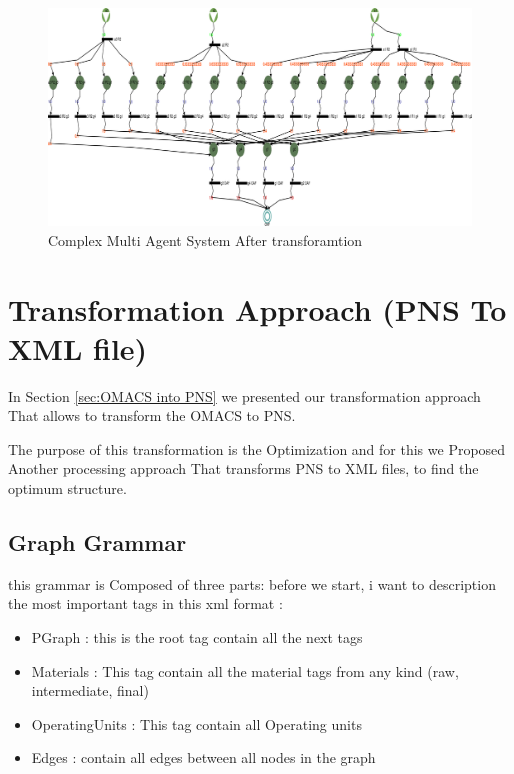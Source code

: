  \begin{landscape}
\begin{figure}[th]
	\centering 
 	\includegraphics[scale=1.3]{ch3/img/articlePNS2}
	\caption{\label{fig:Complex Multi Agent System After transforamtion}Complex Multi Agent System After transforamtion}
\end{figure} 
 
 \end{landscape}


%
%
\section{Transformation Approach (PNS To XML file)\label{sec:xml} }
In Section \ref{sec:OMACS into PNS} we presented our transformation approach That allows 
to transform the OMACS to PNS.

The purpose of this transformation is the Optimization and for this we
Proposed Another processing approach That transforms PNS to XML 
files, to find the optimum structure.
\subsection{ Graph Grammar }
this grammar is Composed of three parts: 
before we start, i want to description the most important tags in this xml format :
\begin{itemize}

\newcommand{\localtextbulletone}{\textcolor{gray}{\raisebox{.45ex}{\rule{.6ex}{.6ex}}}}
\renewcommand{\labelitemi}{\localtextbulletone}
\item PGraph : this is the root tag contain all the next tags
\item Materials : This tag contain all the material tags from any kind (raw, intermediate, final)
\item OperatingUnits : This tag contain all Operating units
\item Edges : contain all edges between all nodes in the graph
\end{itemize} 

